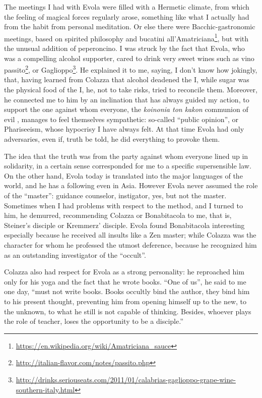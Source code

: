 The meetings I had with Evola were filled with a Hermetic climate, from which the feeling of magical forces regularly arose, something like what I actually had from the habit from personal meditation. Or else there were Bacchic-gastronomic meetings, based on spirited philosophy and bucatini all'Amatriciana\footnote{\url{https://en.wikipedia.org/wiki/Amatriciana_sauce}}, but with the unusual addition of peperoncino. I was struck by the fact that Evola, who was a compelling alcohol supporter, cared to drink very sweet wines such as vino passito\footnote{\url{http://italian-flavor.com/notes/passito.php}}, or Gaglioppo\footnote{\url{http://drinks.seriouseats.com/2011/01/calabrias-gaglioppo-grape-wine-southern-italy.html}}. He explained it to me, saying, I don't know how jokingly, that, having learned from Colazza that alcohol deadened the I, while sugar was the physical food of the I, he, not to take risks, tried to reconcile them. Moreover, he connected me to him by an inclination that has always guided my action, to support the one against whom everyone, the \emph{koinonia ton kakon} communion of evil , manages to feel themselves sympathetic: so-called ``public opinion'', or Phariseeism, whose hypocrisy I have always felt. At that time Evola had only adversaries, even if, truth be told, he did everything to provoke them.

The idea that the truth was from the party against whom everyone lined up in solidarity, in a certain sense corresponded for me to a specific supersensible law. On the other hand, Evola today is translated into the major languages of the world, and he has a following even in Asia. However Evola never assumed the role of the ``master'': guidance counselor, instigator, yes, but not the master. Sometimes when I had problems with respect to the method, and I turned to him, he demurred, recommending Colazza or Bonabitacola to me, that is, Steiner's disciple or Kremmerz' disciple. Evola found Bonabitacola interesting especially because he received all insults like a Zen master; while Colazza was the character for whom he professed the utmost deference, because he recognized him as an outstanding investigator of the ``occult''.

Colazza also had respect for Evola as a strong personality: he reproached him only for his yoga and the fact that he wrote books. ``One of us'', he said to me one day, ``must not write books. Books occultly bind the author, they bind him to his present thought, preventing him from opening himself up to the new, to the unknown, to what he still is not capable of thinking. Besides, whoever plays the role of teacher, loses the opportunity to be a disciple.''

